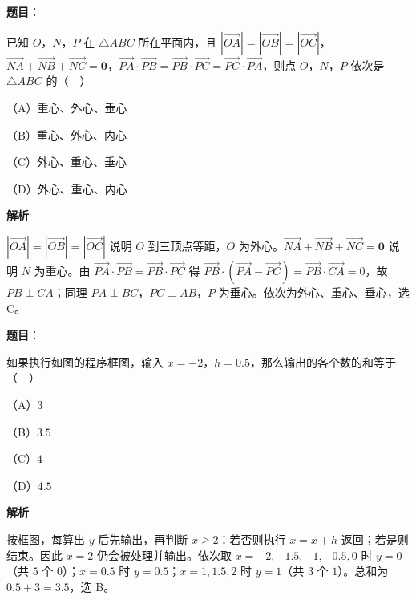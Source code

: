 \begin{answer}

\textbf{题目}：

已知 $O$，$N$，$P$ 在 $\triangle ABC$ 所在平面内，且 $\left|\overrightarrow{OA}\right|=\left|\overrightarrow{OB}\right|=\left|\overrightarrow{OC}\right|$，$\overrightarrow{NA}+\overrightarrow{NB}+\overrightarrow{NC}=\mathbf 0$，$\overrightarrow{PA}\cdot\overrightarrow{PB}=\overrightarrow{PB}\cdot\overrightarrow{PC}=\overrightarrow{PC}\cdot\overrightarrow{PA}$，则点 $O$，$N$，$P$ 依次是 $\triangle ABC$ 的（　）

（A）重心、外心、垂心

（B）重心、外心、内心

（C）外心、重心、垂心

（D）外心、重心、内心

\textbf{解析}

$\left|\overrightarrow{OA}\right|=\left|\overrightarrow{OB}\right|=\left|\overrightarrow{OC}\right|$ 说明 $O$ 到三顶点等距，$O$ 为外心。$\overrightarrow{NA}+\overrightarrow{NB}+\overrightarrow{NC}=\mathbf 0$ 说明 $N$ 为重心。由 $\overrightarrow{PA}\cdot\overrightarrow{PB}=\overrightarrow{PB}\cdot\overrightarrow{PC}$ 得 $\overrightarrow{PB}\cdot(\overrightarrow{PA}-\overrightarrow{PC})=\overrightarrow{PB}\cdot\overrightarrow{CA}=0$，故 $PB\perp CA$；同理 $PA\perp BC$，$PC\perp AB$，$P$ 为垂心。依次为外心、重心、垂心，选 C。


\end{answer}
\begin{answer}

\textbf{题目}：

如果执行如图的程序框图，输入 $x=-2$，$h=0.5$，那么输出的各个数的和等于（　）
\nopagebreak[4]
\begin{center}\end{center}
\nopagebreak[4]
（A）$3$

（B）$3.5$

（C）$4$

（D）$4.5$

\textbf{解析}

按框图，每算出 $y$ 后先输出，再判断 $x\geqslant2$：若否则执行 $x=x+h$ 返回；若是则结束。因此 $x=2$ 仍会被处理并输出。依次取 $x=-2,-1.5,-1,-0.5,0$ 时 $y=0$（共 $5$ 个 $0$）；$x=0.5$ 时 $y=0.5$；$x=1,1.5,2$ 时 $y=1$（共 $3$ 个 $1$）。总和为 $0.5+3=3.5$，选 B。


\end{answer}
